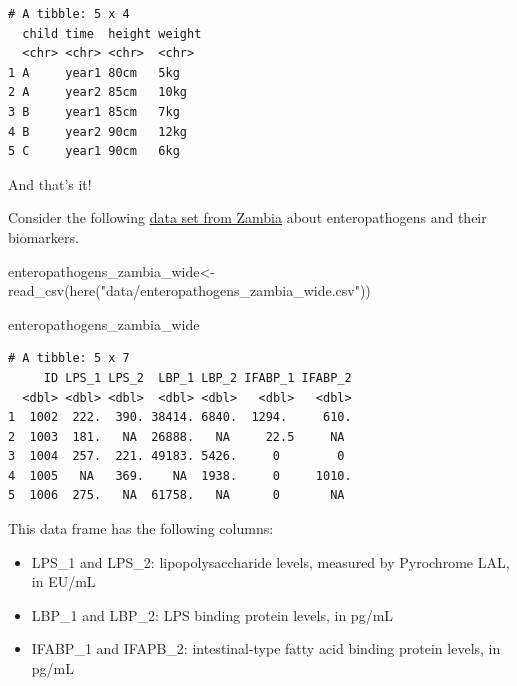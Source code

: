 \documentclass[
  letterpaper,
  DIV=11,
  numbers=noendperiod]{scrreprt}
\newenvironment{Shaded}{\begin{snugshade}}{\end{snugshade}}
\newcommand{\FunctionTok}[1]{\textcolor[rgb]{0.28,0.35,0.67}{#1}}
\newcommand{\NormalTok}[1]{\textcolor[rgb]{0.00,0.23,0.31}{#1}}
\newcommand{\OtherTok}[1]{\textcolor[rgb]{0.00,0.23,0.31}{#1}}
\newcommand{\StringTok}[1]{\textcolor[rgb]{0.13,0.47,0.30}{#1}}
\begin{document}
\begin{verbatim}
# A tibble: 5 x 4
  child time  height weight
  <chr> <chr> <chr>  <chr> 
1 A     year1 80cm   5kg   
2 A     year2 85cm   10kg  
3 B     year1 85cm   7kg   
4 B     year2 90cm   12kg  
5 C     year1 90cm   6kg   
\end{verbatim}

And that's it!

\begin{tcolorbox}[enhanced jigsaw, titlerule=0mm, colback=white, left=2mm, breakable, opacitybacktitle=0.6, colbacktitle=quarto-callout-tip-color!10!white, colframe=quarto-callout-tip-color-frame, bottomtitle=1mm, opacityback=0, coltitle=black, arc=.35mm, toptitle=1mm, title=\textcolor{quarto-callout-tip-color}{\faLightbulb}\hspace{0.5em}{Practice}, leftrule=.75mm, toprule=.15mm, bottomrule=.15mm, rightrule=.15mm]

Consider the following \href{https://zenodo.org/record/4571669}{data set
from Zambia} about enteropathogens and their biomarkers.

\begin{Shaded}
\begin{Highlighting}[]
\NormalTok{enteropathogens\_zambia\_wide}\OtherTok{\textless{}{-}} \FunctionTok{read\_csv}\NormalTok{(}\FunctionTok{here}\NormalTok{(}\StringTok{"data/enteropathogens\_zambia\_wide.csv"}\NormalTok{))}

\NormalTok{enteropathogens\_zambia\_wide}
\end{Highlighting}
\end{Shaded}

\begin{verbatim}
# A tibble: 5 x 7
     ID LPS_1 LPS_2  LBP_1 LBP_2 IFABP_1 IFABP_2
  <dbl> <dbl> <dbl>  <dbl> <dbl>   <dbl>   <dbl>
1  1002  222.  390. 38414. 6840.  1294.     610.
2  1003  181.   NA  26888.   NA     22.5     NA 
3  1004  257.  221. 49183. 5426.     0        0 
4  1005   NA   369.    NA  1938.     0     1010.
5  1006  275.   NA  61758.   NA      0       NA 
\end{verbatim}

This data frame has the following columns:

\begin{itemize}
\item
  LPS\_1 and LPS\_2: lipopolysaccharide levels, measured by Pyrochrome
  LAL, in EU/mL
\item
  LBP\_1 and LBP\_2: LPS binding protein levels, in pg/mL
\item
  IFABP\_1 and IFAPB\_2: intestinal-type fatty acid binding protein
  levels, in pg/mL
\end{itemize}


\end{tcolorbox}
\end{document}

